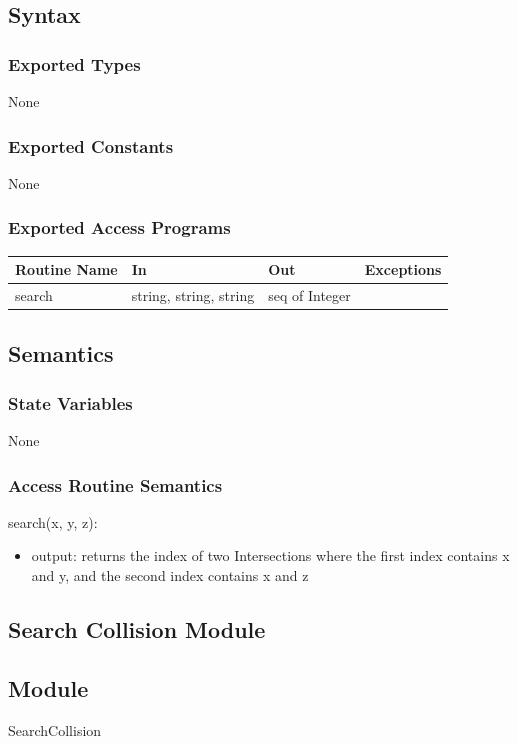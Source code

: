 \documentclass[12pt]{article}
\begin{document}
\subsection*{Syntax}
\subsubsection*{Exported Types}
None

\subsubsection*{Exported Constants}
None

\subsubsection*{Exported Access Programs}
    \begin{tabular}{|l|l|l|l|}
    \hline
    \textbf{Routine Name} & \textbf{In} & \textbf{Out} & \textbf{Exceptions}\\
    \hline
    search & string, string, string & seq of Integer & ~\\
    \hline
    \end{tabular}
    
\subsection*{Semantics}
\subsubsection*{State Variables}
None

\subsubsection*{Access Routine Semantics}
\noindent search(x, y, z):
\begin{itemize}
    \item output: returns the index of two Intersections where the first index contains x and y, and the second index contains x and z
\end{itemize}

\newpage
\subsection{Search Collision Module}
\subsection*{Module}
SearchCollision
\end{document}
